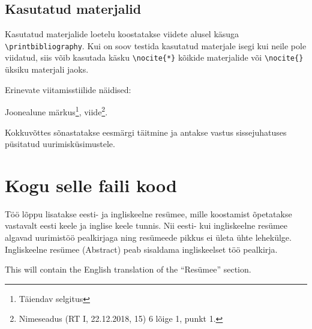 \documentclass{trkut}%
\begin{document}
\section{Kasutatud materjalid}
Kasutatud materjalide loetelu koostatakse viidete alusel käsuga \verb!\printbibliography!. Kui on soov testida kasutatud materjale isegi kui neile pole viidatud, siis võib kasutada käsku \verb!\nocite{*}! kõikide materjalide või \verb!\nocite{}! üksiku materjali jaoks. \parencite[1--5]{palma15}

Erinevate viitamisstiilide näidised: \parencite[333]{test0}

\parencite{test12a} \parencite{test12b}

\parencite{test9}

\parencite[27]{test3}

\parencite{test11}

\parencite{ee1}

\parencite{wiki1}

Joonealune märkus\footnote{Täiendav selgitus}, viide\footnote{Nimeseadus (RT I, 22.12.2018, 15) \textsection{}6 lõige 1, punkt 1.}.


Kokkuvõttes sõnastatakse eesmärgi täitmine ja antakse vastus sissejuhatuses püsitatud uurimisküsimustele.

\nocite{*}
\printbibliography

\appendix

\chapter{Kogu selle faili kood}\label{lisa1}
\tiny

\normalsize

\appendixend

Töö lõppu lisatakse eesti- ja ingliskeelne resümee, mille koostamist õpetatakse vastavalt eesti keele ja inglise keele tunnis. Nii eesti- kui ingliskeelne resümee algavad uurimistöö pealkirjaga ning resümeede pikkus ei ületa ühte lehekülge. Ingliskeelne resümee (Abstract) peab sisaldama ingliskeelset töö pealkirja.

This will contain the English translation of the \enquote{Resümee} section.

\kinnitusleht
\end{document}
